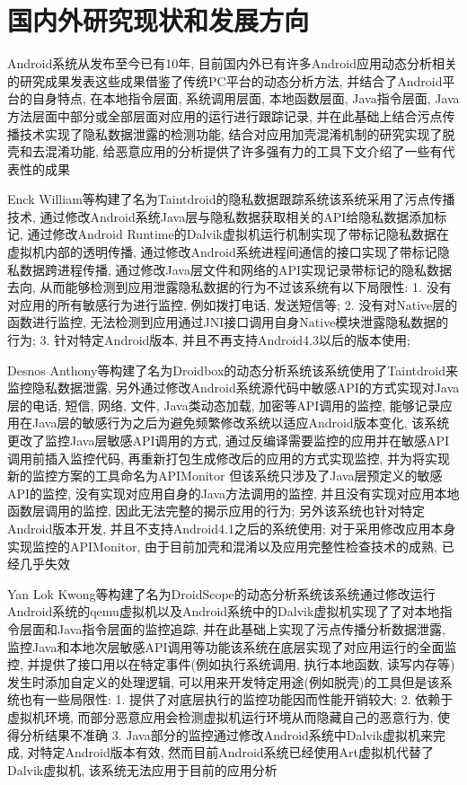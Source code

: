 \section{国内外研究现状和发展方向}
Android系统从发布至今已有10年, 目前国内外已有许多Android应用动态分析相关的研究成果发表\juhao 这些成果借鉴了传统PC平台的动态分析方法, 并结合了Android平台的自身特点, 在本地指令层面, 系统调用层面, 本地函数层面, Java指令层面, Java方法层面中部分或全部层面对应用的运行进行跟踪记录, 并在此基础上结合污点传播技术实现了隐私数据泄露的检测功能, 结合对应用加壳混淆机制的研究实现了脱壳和去混淆功能, 给恶意应用的分析提供了许多强有力的工具\juhao 下文介绍了一些有代表性的成果\juhao

Enck William等构建了名为Taintdroid的隐私数据跟踪系统\juhao 该系统采用了污点传播技术, 通过修改Android系统Java层与隐私数据获取相关的API给隐私数据添加标记, 通过修改Android Runtime的Dalvik虚拟机运行机制实现了带标记隐私数据在虚拟机内部的透明传播, 通过修改Android系统进程间通信的接口实现了带标记隐私数据跨进程传播, 通过修改Java层文件和网络的API实现记录带标记的隐私数据去向, 从而能够检测到应用泄露隐私数据的行为\juhao 不过该系统有以下局限性: 
1. 没有对应用的所有敏感行为进行监控, 例如拨打电话, 发送短信等;
2. 没有对Native层的函数进行监控, 无法检测到应用通过JNI接口调用自身Native模块泄露隐私数据的行为;
3. 针对特定Android版本, 并且不再支持Android4.3以后的版本使用;
 
Desnos Anthony等构建了名为Droidbox的动态分析系统\juhao 该系统使用了Taintdroid来监控隐私数据泄露, 另外通过修改Android系统源代码中敏感API的方式实现对Java层的电话, 短信, 网络, 文件, Java类动态加载, 加密等API调用的监控, 能够记录应用在Java层的敏感行为\juhao 之后为避免频繁修改系统以适应Android版本变化, 该系统更改了监控Java层敏感API调用的方式, 通过反编译需要监控的应用并在敏感API调用前插入监控代码, 再重新打包生成修改后的应用的方式实现监控, 并为将实现新的监控方案的工具命名为APIMonitor\juhao 
但该系统只涉及了Java层预定义的敏感API的监控, 没有实现对应用自身的Java方法调用的监控, 并且没有实现对应用本地函数层调用的监控, 因此无法完整的揭示应用的行为; 另外该系统也针对特定Android版本开发, 并且不支持Android4.1之后的系统使用; 对于采用修改应用本身实现监控的APIMonitor, 由于目前加壳和混淆以及应用完整性检查技术的成熟, 已经几乎失效\juhao

Yan Lok Kwong等构建了名为DroidScope的动态分析系统\juhao 该系统通过修改运行Android系统的qemu虚拟机以及Android系统中的Dalvik虚拟机实现了了对本地指令层面和Java指令层面的监控追踪, 并在此基础上实现了污点传播分析数据泄露, 监控Java和本地次层敏感API调用等功能\juhao 该系统在底层实现了对应用运行的全面监控, 并提供了接口用以在特定事件(例如执行系统调用, 执行本地函数, 读写内存等)发生时添加自定义的处理逻辑, 可以用来开发特定用途(例如脱壳)的工具\juhao 但是该系统也有一些局限性: 
1. 提供了对底层执行的监控功能因而性能开销较大; 
2. 依赖于虚拟机环境, 而部分恶意应用会检测虚拟机运行环境从而隐藏自己的恶意行为, 使得分析结果不准确
3. Java部分的监控通过修改Android系统中Dalvik虚拟机来完成, 对特定Android版本有效, 然而目前Android系统已经使用Art虚拟机代替了Dalvik虚拟机, 该系统无法应用于目前的应用分析\juhao

